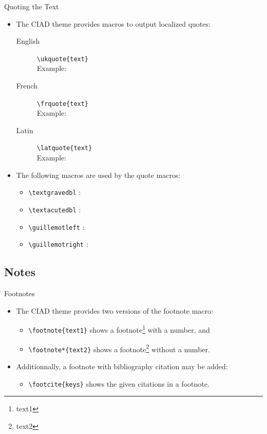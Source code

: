 \documentclass[english,sectioncirclenumberstyle]{ciadbeamer}
\begin{document}
\begin{frame}{Quoting the Text}
	\begin{itemize}
	\item The CIAD theme provides macros to output localized quotes:
		\begin{description}
		\item[English] \texttt{{\textbackslash}ukquote\{text\}} \\
			Example: 
		\item[French] \texttt{{\textbackslash}frquote\{text\}} \\
			Example: 
		\item[Latin] \texttt{{\textbackslash}latquote\{text\}} \\
			Example: 
		\end{description}
	\vspace{1em}
	\item The following macros are used by the quote macros:
		\begin{itemize}
		\item \texttt{{\textbackslash}textgravedbl} : \textgravedbl
		\item \texttt{{\textbackslash}textacutedbl} : \textacutedbl
		\item \texttt{{\textbackslash}guillemotleft} : \guillemotleft
		\item \texttt{{\textbackslash}guillemotright} : \guillemotright
		\end{itemize}
	\end{itemize}
\end{frame}

\subsection{Notes}
\tableofcontentslide[sectionstyle={show/shaded},subsectionstyle={show/shaded/hide},subsubsectionstyle={hide/hide/hide/hide},sections={3-}]

\begin{frame}{Footnotes}
	\begin{itemize}
	\item The CIAD theme provides two versions of the footnote macro:
		\begin{itemize}
		\item \texttt{{\textbackslash}footnote\{text1\}} shows a footnote\footnote{text1} with a number, and
		\item \texttt{{\textbackslash}footnote*\{text2\}} shows a footnote\footnote*{text2} without a number.
		\end{itemize}
	\vspace{1em}
	\item Additionnally, a footnote with bibliography citation may be added:
		\begin{itemize}
		\item \texttt{{\textbackslash}footcite\{keys\}} shows the given citations in a footnote.
		\end{itemize}
	\end{itemize}
\end{frame}
\end{document}
